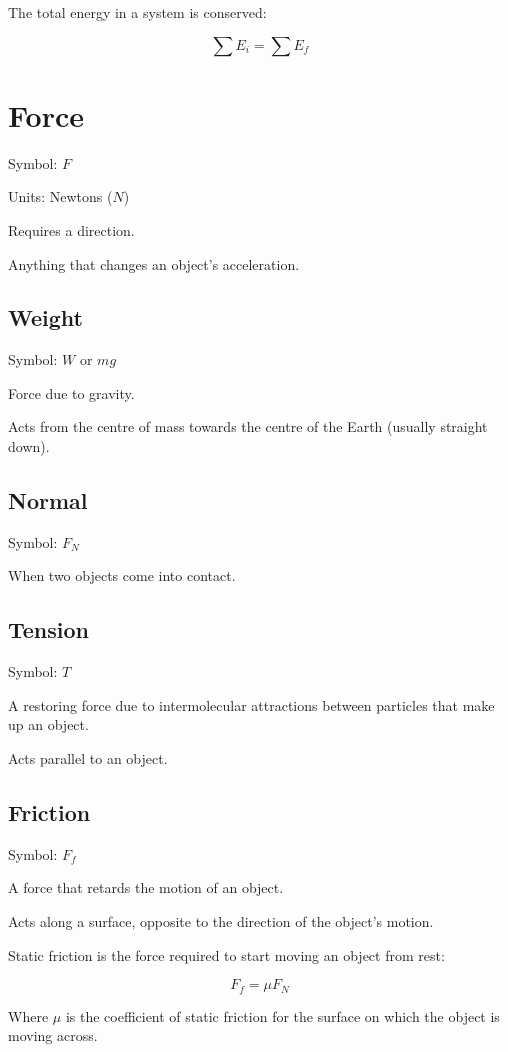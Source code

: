 \documentclass[a4paper,11pt]{report}
\begin{document}
The total energy in a system is conserved:

$$
\sum E_i = \sum E_f
$$


\section{Force}

Symbol: $F$

Units: Newtons ($N$)

Requires a direction.

Anything that changes an object's acceleration.

\subsection{Weight}

Symbol: $W$ or $mg$

Force due to gravity.

Acts from the centre of mass towards the centre of the Earth (usually straight
down).

\subsection{Normal}

Symbol: $F_N$

When two objects come into contact.

\subsection{Tension}

Symbol: $T$

A restoring force due to intermolecular attractions between particles that make
up an object.

Acts parallel to an object.

\subsection{Friction}

Symbol: $F_f$

A force that retards the motion of an object.

Acts along a surface, opposite to the direction of the object's motion.

Static friction is the force required to start moving an object from rest:

$$
F_f = \mu F_N
$$

Where $\mu$ is the coefficient of static friction for the surface on which the
object is moving across.
\end{document}
